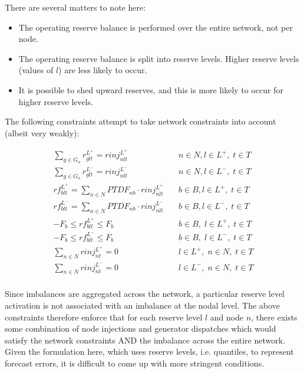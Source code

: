 \documentclass[number,times]{elsarticle}
\begin{document}
There are several matters to note here:

\begin{itemize}
    \item The operating reserve balance is performed over the entire network, not per node.
    \item The operating reserve balance is split into reserve levels. Higher reserve levels (values of $l$) are less likely to occur.
    \item It is possible to shed upward reserves, and this is more likely to occur for higher reserve levels.
\end{itemize}

The following constraints attempt to take network constraints into account (albeit very weakly):

\begin{align}
    \sum_{g \in G_n} r^{L^+}_{glt} = rinj^{L^+}_{nlt}                & \quad n \in N, l \in L^+, \; t \in T    \\
    \sum_{g \in G_n} r^{L^-}_{glt} = rinj^{L^-}_{nlt}                & \quad n \in N, l \in L^-, \; t \in T    \\
    rf^{L^+}_{blt} = \sum_{n \in N} PTDF_{nb} \cdot rinj^{L^+}_{nlt} & \quad b \in B, l \in L^+, \; t \in T    \\
    rf^{L^-}_{blt} = \sum_{n \in N} PTDF_{nb} \cdot rinj^{L^-}_{nlt} & \quad b \in B, l \in L^-, \; t \in T    \\
    -F_{b} \leq rf^{L^+}_{blt} \leq F_b                              & \quad b \in B, \; l \in L^+, \; t \in T \\
    -F_{b} \leq rf^{L^-}_{blt} \leq F_b                              & \quad b \in B, \; l \in L^-, \; t \in T \\
    \sum_{n \in N} rinj^{L^+}_{nt} = 0                               & \quad l \in L^+, \; n \in N, \; t \in T \\
    \sum_{n \in N} rinj^{L^-}_{nt} = 0                               & \quad l \in L^-, \; n \in N, \; t \in T \\
\end{align}

Since imbalances are aggregated across the network, a particular reserve level activation is not associated with an imbalance at the nodal level. The above constraints therefore enforce that for each reserve level $l$ and node $n$, there exists some combination of node injections and generator dispatches which would satisfy the network constraints AND the imbalance across the entire network. Given the formulation here, which uses reserve levels, i.e. quantiles, to represent forecast errors, it is difficult to come up with more stringent conditions.

\end{document}
